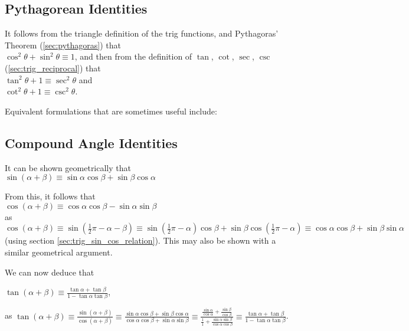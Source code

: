 \documentclass[a4paper,11pt]{article}
\begin{document}
    \subsection{Pythagorean Identities} \label{sec:trig_pythag}

    It follows from the triangle definition of the trig functions, and
    Pythagoras' Theorem (\ref{sec:pythagoras}) that
    \\$\cos^2 \theta + \sin^2 \theta \equiv 1$, and then from the definition of
    $\tan$, $\cot$, $\sec$, $\csc$ (\ref{sec:trig_reciprocal}) that
    \\$\tan^2 \theta + 1 \equiv \sec^2 \theta$ and
    \\$\cot^2 \theta + 1 \equiv \csc^2 \theta$.

    Equivalent formulations that are sometimes useful include:


    \subsection{Compound Angle Identities} \label{sec:comp_angle}


    It can be shown geometrically that
    \\$\sin(\alpha + \beta) \equiv
       \sin \alpha \cos \beta +  \sin \beta \cos \alpha$

    From this, it follows that
    \\$\cos(\alpha + \beta) \equiv
       \cos \alpha \cos \beta - \sin \alpha \sin \beta$
    \\as $\cos(\alpha + \beta) \equiv \sin(\frac 12 \pi - \alpha - \beta) \equiv
        \sin(\frac 12 \pi - \alpha)\cos \beta +
        \sin \beta \cos(\frac 12 \pi - \alpha) \equiv
        \cos \alpha \cos \beta + \sin \beta \sin \alpha$
    (using section \ref{sec:trig_sin_cos_relation}). This may also be shown
    with a similar geometrical argument.

    We can now deduce that

    $\displaystyle \tan(\alpha + \beta) \equiv
        \frac{\tan \alpha + \tan \beta}{1 - \tan \alpha \tan \beta}$,

    as $\displaystyle\tan(\alpha + \beta) \equiv
        \frac{\sin(\alpha + \beta)}{\cos(\alpha + \beta)} \equiv
        \frac{\sin \alpha \cos \beta + \sin \beta \cos \alpha}
             {\cos \alpha \cos \beta + \sin \alpha \sin \beta} \equiv
        \frac{\frac{\sin \alpha}{\cos \alpha} + \frac{\sin \beta}{\cos \beta}}
             {\frac 11 + \frac{\sin \alpha \sin \beta}{\cos \alpha \cos \beta}}
             \equiv
        \frac{\tan \alpha + \tan \beta}{1 - \tan \alpha \tan \beta}$.
\end{document}
